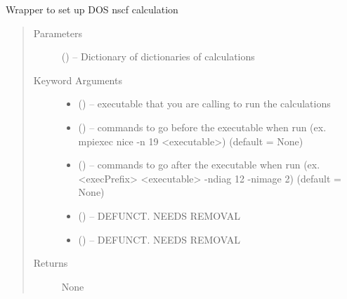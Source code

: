 \documentclass[letterpaper,10pt,english]{sphinxmanual}
\begin{document}

\begin{fulllineitems}
\label{\detokenize{run:run.dos}}
Wrapper to set up DOS nscf calculation
\begin{quote}\begin{description}
\item[{Parameters}] \leavevmode
{} () -- Dictionary of dictionaries of calculations

\item[{Keyword Arguments}] \leavevmode\begin{itemize}
\item {} 
 () -- executable that you are calling to run the calculations

\item {} 
 () -- commands to go before the executable when run
(ex. mpiexec nice -n 19 \textless{}executable\textgreater{}) (default = None)

\item {} 
 () -- commands to go after the executable when run
(ex. \textless{}execPrefix\textgreater{} \textless{}executable\textgreater{} -ndiag 12 -nimage 2) (default = None)

\item {} 
 () -- DEFUNCT. NEEDS REMOVAL

\item {} 
 () -- DEFUNCT. NEEDS REMOVAL

\end{itemize}

\item[{Returns}] \leavevmode
None

\end{description}\end{quote}

\end{fulllineitems}

\end{document}
